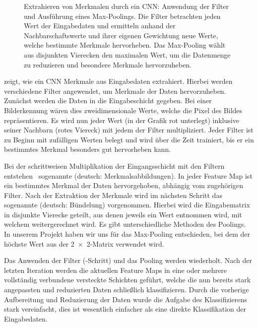 \begin{figure}
    \centering
    
    \caption[Merkmalsextraktion eines CNN]{Extrahieren von Merkmalen durch ein CNN: Anwendung der Filter und Ausführung eines Max-Poolings. Die Filter betrachten jeden Wert der Eingabedaten und ermitteln anhand der Nachbarschaftswerte und ihrer eigenen Gewichtung neue Werte, welche bestimmte Merkmale hervorheben. Das Max-Pooling wählt aus disjunkten Vierecken den maximalen Wert, um die Datenmenge zu reduzieren und besondere Merkmale hervorzuheben.}
\end{figure}

 zeigt, wie ein CNN Merkmale aus Eingabedaten extrahiert.
Hierbei werden verschiedene Filter angewendet, um Merkmale der Daten  hervorzuheben.
Zunächst werden die Daten in die Eingabeschicht gegeben. Bei einer Bild\-erkennung wären dies zweidimensionale Werte, welche die Pixel des Bildes repräsentieren.
Es wird nun jeder Wert (in der Grafik rot unterlegt) inklusive seiner Nachbarn (rotes Viereck) mit jedem der  Filter multipliziert.
Jeder Filter ist zu Beginn mit zufälligen Werten belegt und wird über die Zeit trainiert, bis er ein bestimmtes Merkmal besonders gut hervorheben kann.

Bei der schrittweisen Multiplikation der Eingangsschicht mit den Filtern entstehen ~sogenannte  (deutsch: Merkmalsabbildungen). In jeder Feature Map ist ein bestimmtes Merkmal der Daten hervorgehoben, abhängig vom zugehörigen Filter.
Nach der Extraktion der Merkmale wird im nächsten Schritt das sogenannte  (deutsch: Bündelung) vorgenommen. Hierbei wird die Eingabematrix in disjunkte Vierecke geteilt, aus denen jeweils ein Wert entnommen wird, mit welchem weitergerechnet wird.
Es gibt unterschiedliche Methoden des Poolings. In unserem Projekt haben wir uns für das Max-Pooling entschieden, bei dem der höchste Wert aus der \num{2x2}-Matrix verwendet wird.


Das Anwenden der Filter (-Schritt) und das Pooling werden wiederholt. Nach der letzten Iteration werden die aktuellen Feature Maps in eine oder mehrere vollständig verbundene versteckte Schichten geführt, welche die nun bereits stark angepassten und reduzierten Daten schließlich klassifizieren. Durch die vorherige Aufbereitung und Reduzierung der Daten wurde die Aufgabe des Klassifizierens stark vereinfacht, dies ist wesentlich einfacher als eine direkte Klassifikation der Eingabedaten.

